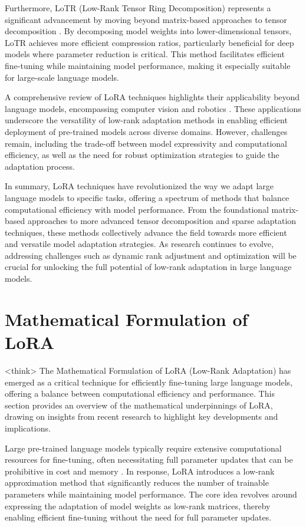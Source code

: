 \documentclass[conference]{IEEEtran}
\begin{document}
Furthermore, LoTR (Low-Rank Tensor Ring Decomposition) represents a significant advancement by moving beyond matrix-based approaches to tensor decomposition \cite{b5}. By decomposing model weights into lower-dimensional tensors, LoTR achieves more efficient compression ratios, particularly beneficial for deep models where parameter reduction is critical. This method facilitates efficient fine-tuning while maintaining model performance, making it especially suitable for large-scale language models.

A comprehensive review of LoRA techniques highlights their applicability beyond language models, encompassing computer vision and robotics \cite{b6}. These applications underscore the versatility of low-rank adaptation methods in enabling efficient deployment of pre-trained models across diverse domains. However, challenges remain, including the trade-off between model expressivity and computational efficiency, as well as the need for robust optimization strategies to guide the adaptation process.

In summary, LoRA techniques have revolutionized the way we adapt large language models to specific tasks, offering a spectrum of methods that balance computational efficiency with model performance. From the foundational matrix-based approaches to more advanced tensor decomposition and sparse adaptation techniques, these methods collectively advance the field towards more efficient and versatile model adaptation strategies. As research continues to evolve, addressing challenges such as dynamic rank adjustment and optimization will be crucial for unlocking the full potential of low-rank adaptation in large language models.

\section{Mathematical Formulation of LoRA}
<think>
The Mathematical Formulation of LoRA (Low-Rank Adaptation) has emerged as a critical technique for efficiently fine-tuning large language models, offering a balance between computational efficiency and performance. This section provides an overview of the mathematical underpinnings of LoRA, drawing on insights from recent research to highlight key developments and implications.

Large pre-trained language models typically require extensive computational resources for fine-tuning, often necessitating full parameter updates that can be prohibitive in cost and memory \cite{bX}. In response, LoRA introduces a low-rank approximation method that significantly reduces the number of trainable parameters while maintaining model performance. The core idea revolves around expressing the adaptation of model weights as low-rank matrices, thereby enabling efficient fine-tuning without the need for full parameter updates.
\end{document}

